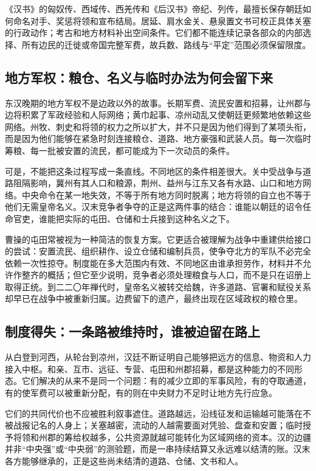 \begin{sourcenote}[边地材料的尺度]
《汉书》的匈奴传、西域传、西羌传和《后汉书》帝纪、列传，最擅长保存朝廷如何命名对手、奖惩将领和宣布结局。居延、肩水金关、悬泉置文书可校正具体关塞的行政动作；考古和地方材料补出空间条件。它们都不能连续记录各部众的内部选择、所有边民的迁徙或帝国完整军费，故兵数、路线与“平定”范围必须保留限度。
\end{sourcenote}

\subsection{地方军权：粮仓、名义与临时办法为何会留下来}

东汉晚期的地方军权不是边政以外的故事。长期军费、流民安置和招募，让州郡与边将积累了军政经验和人际网络；黄巾起事、凉州动乱又使朝廷更频繁地依赖这些网络。州牧、刺史和将领的权力之所以扩大，并不只是因为他们得到了某项头衔，而是因为他们能够在紧急时刻连接粮仓、道路、地方豪强和武装人员。每一次临时筹粮、每一批被安置的流民，都可能成为下一次动员的条件。

可是，不能把这条过程写成一条直线。不同地区的条件相差很大。关中受战争与道路阻隔影响，冀州有其人口和粮源，荆州、益州与江东又各有水路、山口和地方网络。中央命令在某一地失效，不等于所有地方同时脱离；地方将领的自立也不等于他们无需皇帝名义。汉末竞争者争夺的正是这两件事的结合：谁能以朝廷的诏令任命官吏，谁能把实际的屯田、仓储和士兵接到这种名义之下。

曹操的屯田常被视为一种简洁的恢复方案。它更适合被理解为战争中重建供给接口的尝试：安置流民、组织耕作、设立仓储和编制兵员，使争夺北方的军队不必完全依赖一次性掠夺。制度能在多大范围内有效、不同地区由谁承担劳作，材料并不允许作整齐的概括；但它至少说明，竞争者必须处理粮食与人口，而不是只在诏册上取得正统。到二二〇年禅代时，皇帝名义被转交给魏，许多道路、官署和赋役关系却早已在战争中被重新归属。边费留下的遗产，最终出现在区域政权的粮仓里。

\subsection{制度得失：一条路被维持时，谁被迫留在路上}

从白登到河西，从轮台到凉州，汉廷不断证明自己能够把远方的信息、物资和人力接入中枢。和亲、互市、远征、专营、屯田和州郡招募，都是这种能力的不同形态。它们解决的从来不是同一个问题：有的减少立即的军事风险，有的夺取通道，有的使军费可以被重新分配，有的则在中央财力不足时让地方先行应急。

它们的共同代价也不应被胜利叙事遮住。道路越远，沿线征发和运输越可能落在不被战报记名的人身上；关塞越密，流动的人越需要面对凭验、盘查和安置；临时授予将领和州郡的筹给权越多，公共资源就越可能转化为区域网络的资本。汉的边疆并非“中央强”或“中央弱”的测验题，而是一串持续结算又永远难以结清的账。汉末各方能够继承的，正是这些尚未结清的道路、仓储、文书和人。

